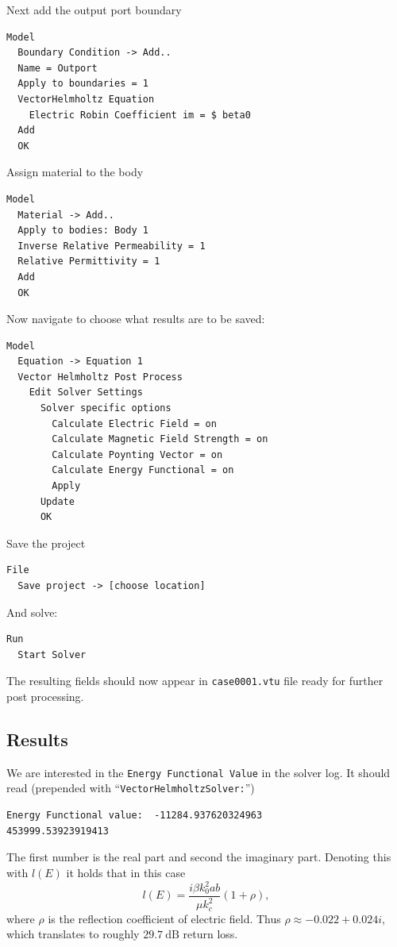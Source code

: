 Next add the output port boundary
\begin{verbatim}
Model
  Boundary Condition -> Add..
  Name = Outport
  Apply to boundaries = 1
  VectorHelmholtz Equation
    Electric Robin Coefficient im = $ beta0
  Add
  OK
\end{verbatim}

Assign material to the body
\begin{verbatim}
Model
  Material -> Add..
  Apply to bodies: Body 1
  Inverse Relative Permeability = 1
  Relative Permittivity = 1
  Add
  OK
\end{verbatim}

Now navigate to choose what results are to be saved:
\begin{verbatim}
Model
  Equation -> Equation 1
  Vector Helmholtz Post Process
    Edit Solver Settings
      Solver specific options
        Calculate Electric Field = on
        Calculate Magnetic Field Strength = on
        Calculate Poynting Vector = on
        Calculate Energy Functional = on
        Apply
      Update
      OK
\end{verbatim}

Save the project
\begin{verbatim}
File
  Save project -> [choose location]
\end{verbatim}

And solve:
\begin{verbatim}
Run
  Start Solver
\end{verbatim}

The resulting fields should now appear in \texttt{case0001.vtu} file ready for further post processing.

\subsection*{Results}
We are interested in the \texttt{Energy Functional Value} in the solver log. It should read (prepended with ``\texttt{VectorHelmholtzSolver:}'')

\small{
\begin{verbatim}
Energy Functional value:  -11284.937620324963        453999.53923919413
\end{verbatim}
}

The first number is the real part and second the imaginary part. Denoting this with $l(E)$ it holds that in this case \[l(E) = \frac {i \beta k_0^2 ab}{\mu k_c^2} (1+\rho),\] where $\rho$ is the reflection coefficient of electric field. Thus $\rho\approx-0.022+0.024i$, which translates to roughly $29.7~\mathrm{dB}$ return loss.

